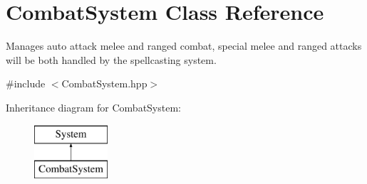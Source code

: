 \hypertarget{class_combat_system}{}\section{Combat\+System Class Reference}
\label{class_combat_system}


Manages auto attack melee and ranged combat, special melee and ranged attacks will be both handled by the spellcasting system.  




{\ttfamily \#include $<$Combat\+System.\+hpp$>$}

Inheritance diagram for Combat\+System\+:\begin{figure}[H]
\begin{center}
\leavevmode
\includegraphics[height=2.000000cm]{class_combat_system}
\end{center}
\end{figure}
